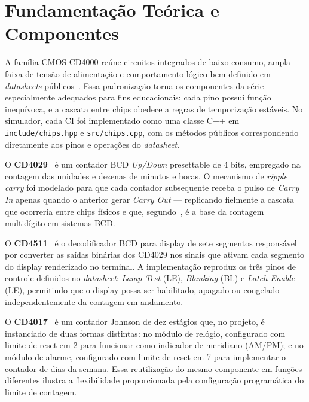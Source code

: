 \documentclass[12pt]{article}
\begin{document}
\section{Fundamentação Teórica e Componentes}

A família CMOS CD4000 reúne circuitos integrados de baixo consumo, ampla faixa de tensão de alimentação e comportamento lógico bem definido em \textit{datasheets} públicos~\cite{floyd}. Essa padronização torna os componentes da série especialmente adequados para fins educacionais: cada pino possui função inequívoca, e a cascata entre chips obedece a regras de temporização estáveis. No simulador, cada CI foi implementado como uma classe C++ em \texttt{include/chips.hpp} e \texttt{src/chips.cpp}, com os métodos públicos correspondendo diretamente aos pinos e operações do \textit{datasheet}.

O \textbf{CD4029}~\cite{ti:cd4029} é um contador BCD \textit{Up/Down} presettable de 4 bits, empregado na contagem das unidades e dezenas de minutos e horas. O mecanismo de \textit{ripple carry} foi modelado para que cada contador subsequente receba o pulso de \textit{Carry In} apenas quando o anterior gerar \textit{Carry Out} — replicando fielmente a cascata que ocorreria entre chips físicos e que, segundo~\cite{tocci}, é a base da contagem multidígito em sistemas BCD.

O \textbf{CD4511}~\cite{ti:cd4511} é o decodificador BCD para display de sete segmentos responsável por converter as saídas binárias dos CD4029 nos sinais que ativam cada segmento do display renderizado no terminal. A implementação reproduz os três pinos de controle definidos no \textit{datasheet}: \textit{Lamp Test} (LE), \textit{Blanking} (BL) e \textit{Latch Enable} (LE), permitindo que o display possa ser habilitado, apagado ou congelado independentemente da contagem em andamento.

O \textbf{CD4017}~\cite{ti:cd4017} é um contador Johnson de dez estágios que, no projeto, é instanciado de duas formas distintas: no módulo de relógio, configurado com limite de reset em 2 para funcionar como indicador de meridiano (AM/PM); e no módulo de alarme, configurado com limite de reset em 7 para implementar o contador de dias da semana. Essa reutilização do mesmo componente em funções diferentes ilustra a flexibilidade proporcionada pela configuração programática do limite de contagem.
\end{document}
